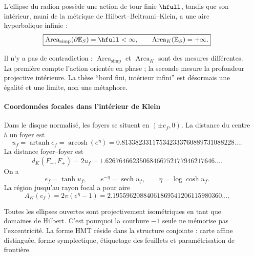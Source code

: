\begin{theorem}
L'ellipse du radion possède une action de tour finie \(\hfull\), tandis que
son intérieur, muni de la métrique de Hilbert--Beltrami--Klein, a une aire
hyperbolique infinie :
\begin{equation}
\boxed{
\operatorname{Area}_{\mathrm{simp}}(\partial\mathbb E_S)=\hfull<\infty,
\qquad
\operatorname{Area}_{K}(\mathbb E_S)=+\infty.}
\label{eq:finite-infinite}
\end{equation}
\end{theorem}

Il n'y a pas de contradiction : \(\operatorname{Area}_{\mathrm{simp}}\) et
\(\operatorname{Area}_K\) sont des mesures différentes. La première compte l'action
orientée en phase ; la seconde mesure la profondeur projective intérieure. La thèse
\enquote{bord fini, intérieur infini} est désormais une égalité et une limite,
non une métaphore.

\paragraph{Coordonnées focales dans l'intérieur de Klein}

Dans le disque normalisé, les foyers se situent en \((\pm e_f,0)\). La distance
du centre à un foyer est
\begin{equation}
u_f=\operatorname{artanh}e_f
=\operatorname{arcosh}(e^\eta)
=0.813382331175342333760889731088228\ldots.
\label{eq:klein-focal}
\end{equation}
La distance foyer--foyer est
\[
d_K(F_-,F_+)=2u_f
=1.62676466235068466752177946217646\ldots.
\]
On a
\begin{equation}
e_f=\tanh u_f,\qquad
e^{-\eta}=\operatorname{sech}u_f,\qquad
\eta=\log\cosh u_f.
\label{eq:focal-hyperbolic-chain}
\end{equation}
La région jusqu'au rayon focal a pour aire
\[
A_K(e_f)=2\pi(e^\eta-1)
=2.19559620884061869541206115980360\ldots.
\]

Toutes les ellipses ouvertes sont projectivement isométriques en tant que domaines de
Hilbert. C'est pourquoi la courbure \(-1\) seule ne mémorise pas l'excentricité. La
forme HMT réside dans la structure conjointe : carte affine distinguée, forme
symplectique, étiquetage des feuillets et paramétrisation de frontière.
